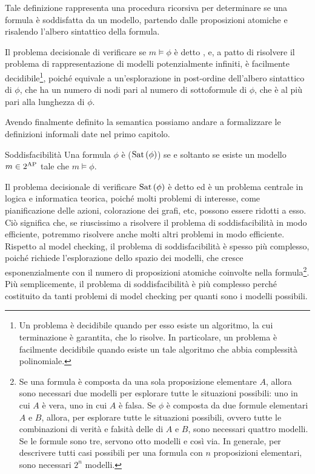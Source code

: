 Tale definizione rappresenta una procedura ricorsiva per determinare se una formula è soddisfatta da un modello, partendo dalle proposizioni atomiche e risalendo l'albero sintattico della formula.

Il problema decisionale di verificare se \(m \models \phi\) è detto , e, a patto di risolvere il problema di rappresentazione di modelli potenzialmente infiniti, è facilmente decidibile\footnote{Un problema è decidibile quando per esso esiste un algoritmo, la cui terminazione è garantita, che lo risolve. In particolare, un problema è facilmente decidibile quando esiste un tale algoritmo che abbia complessità polinomiale.}, poiché equivale a un'esplorazione in post-ordine dell'albero sintattico di \(\phi\), che ha un numero di nodi pari al numero di sottoformule di \(\phi\), che è al più pari alla lunghezza di \(\phi\).

Avendo finalmente definito la semantica possiamo andare a formalizzare le definizioni informali date nel primo capitolo.
\begin{definition}{Soddisfacibilità}
  Una formula \(\phi\) è  (\(\Sat[\phi]\)) se e soltanto se esiste un modello \(m\in 2^{\AP}\) tale che \(m \models \phi\).
\end{definition}

Il problema decisionale di verificare \(\Sat[\phi]\) è detto  ed è un problema centrale in logica e informatica teorica, poiché molti problemi di interesse, come pianificazione delle azioni, colorazione dei grafi, etc, possono essere ridotti a esso. 
Ciò significa che, se riuscissimo a risolvere il problema di soddisfacibilità in modo efficiente, potremmo risolvere anche molti altri problemi in modo efficiente.
Rispetto al model checking, il problema di soddisfacibilità è spesso più complesso, poiché richiede l'esplorazione dello spazio dei modelli, che cresce esponenzialmente con il numero di proposizioni atomiche coinvolte nella formula\footnote{Se una formula è composta da una sola proposizione elementare \(A\), allora sono necessari due modelli per esplorare tutte le situazioni possibili: uno in cui \(A\) è vera, uno in cui \(A\) è falsa. Se \(\phi\) è composta da due formule elementari \(A\) e \(B\), allora, per esplorare tutte le situazioni possibili, ovvero tutte le combinazioni di verità e falsità delle di \(A\) e \(B\), sono necessari quattro modelli. Se le formule sono tre, servono otto modelli e così via. In generale, per descrivere tutti casi possibili per una formula con \(n\) proposizioni elementari, sono necessari \(2^{n}\) modelli.}. 
Più semplicemente, il problema di soddisfacibilità è più complesso perché costituito da tanti problemi di model checking per quanti sono i modelli possibili.

